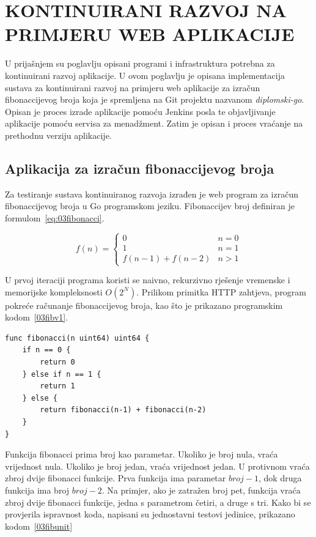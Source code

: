\chapter{KONTINUIRANI RAZVOJ NA PRIMJERU WEB APLIKACIJE}
U prijašnjem su poglavlju opisani programi i infrastruktura potrebna za kontinuirani razvoj
aplikacije. U ovom poglavlju je opisana implementacija sustava za kontinuirani razvoj na primjeru
web aplikacije za izračun fibonaccijevog broja koja je spremljena na Git projektu nazvanom
\textit{diplomski-go}. Opisan je proces izrade aplikacije pomoću Jenkins posla te objavljivanje
aplikacije pomoću servisa za menadžment. Zatim je opisan i proces vraćanje na prethodnu verziju
aplikacije.

\section{Aplikacija za izračun fibonaccijevog broja}
Za testiranje sustava kontinuiranog razvoja izrađen je web program za izračun fibonaccijevog broja
u Go programskom jeziku. Fibonaccijev broj definiran je formulom~\ref{eq:03fibonacci}.

\begin{equation}
    f(n) = \begin{cases}
               0                & n = 0\\
               1                & n = 1\\
               f(n-1) + f(n-2)  & n > 1
           \end{cases}
   \label{eq:03fibonacci}
\end{equation}

U prvoj iteraciji programa koristi se naivno, rekurzivno rješenje vremenske i memorijske
kompleksnosti $O(2^N)$. Prilikom primitka HTTP zahtjeva, program pokreće računanje fibonaccijevog
broja, kao što je prikazano programskim kodom~\ref{03fibv1}.

\begin{lstlisting}[float=h]
func fibonacci(n uint64) uint64 {
	if n == 0 {
		return 0
	} else if n == 1 {
		return 1
	} else {
		return fibonacci(n-1) + fibonacci(n-2)
	}
}
\end{lstlisting}

Funkcija fibonacci prima broj kao parametar. Ukoliko je broj nula, vraća vrijednost nula.
Ukoliko je broj jedan, vraća vrijednost jedan. U protivnom vraća zbroj dvije fibonacci funkcije.
Prva funkcija ima parametar $broj-1$, dok druga funkcija ima broj $broj-2$. Na primjer, ako je
zatražen broj pet, funkcija vraća zbroj dvije fibonacci funkcije, jedna s parametrom četiri, a druge
s tri. Kako bi se provjerila ispravnost koda, napisani su jednostavni testovi jedinice, prikazano
kodom~\ref{03fibunit}

